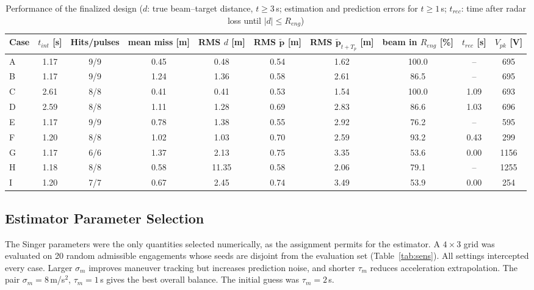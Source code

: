 \documentclass[conference]{IEEEtran}
\newcommand{\vect}[1]{\mathbf{#1}}
\begin{document}
\begin{table}[!t]
\centering
\caption{Performance of the finalized design ($d$: true beam--target distance,
$t\ge3$\,s; estimation and prediction errors for $t\ge1$\,s; $t_{rec}$: time
after radar loss until $|d|\le R_{eng}$)}
\label{tab:cases}
\footnotesize
\begin{tabular}{@{}lccccccccc@{}}
\toprule
Case & $t_{int}$ [s] & Hits/pulses & mean miss [m] & RMS $d$ [m] & RMS $\tilde{\vect p}$ [m] & RMS $\tilde{\vect p}_{t+T_p}$ [m] & beam in $R_{eng}$ [\%] & $t_{rec}$ [s] & $V_{pk}$ [V]\\
\midrule
A & 1.17 & 9/9 & 0.45 & 0.48 & 0.54 & 1.62 & 100.0 & -- & 695 \\
B & 1.17 & 9/9 & 1.24 & 1.36 & 0.58 & 2.61 & 86.5 & -- & 695 \\
C & 2.61 & 8/8 & 0.41 & 0.41 & 0.53 & 1.54 & 100.0 & 1.09 & 693 \\
D & 2.59 & 8/8 & 1.11 & 1.28 & 0.69 & 2.83 & 86.6 & 1.03 & 696 \\
E & 1.17 & 9/9 & 0.78 & 1.38 & 0.55 & 2.92 & 76.2 & -- & 595 \\
F & 1.20 & 8/8 & 1.02 & 1.03 & 0.70 & 2.59 & 93.2 & 0.43 & 299 \\
G & 1.17 & 6/6 & 1.37 & 2.13 & 0.75 & 3.35 & 53.6 & 0.00 & 1156 \\
H & 1.18 & 8/8 & 0.58 & 11.35 & 0.58 & 2.06 & 79.1 & -- & 1255 \\
I & 1.20 & 7/7 & 0.67 & 2.45 & 0.74 & 3.49 & 53.9 & 0.00 & 254 \\
\bottomrule
\end{tabular}
\end{table}

\subsection{Estimator Parameter Selection}
The Singer parameters were the only quantities selected numerically, as the
assignment permits for the estimator. A $4\times3$ grid was evaluated on 20
random admissible engagements whose seeds are disjoint from the evaluation set
(Table~\ref{tab:sens}). All settings intercepted every case. Larger $\sigma_m$
improves maneuver tracking but increases prediction noise, and shorter
$\tau_m$ reduces acceleration extrapolation. The pair $\sigma_m=8$\,m/s$^2$,
$\tau_m=1$\,s gives the best overall balance. The initial guess was
$\tau_m=2$\,s.
\end{document}
